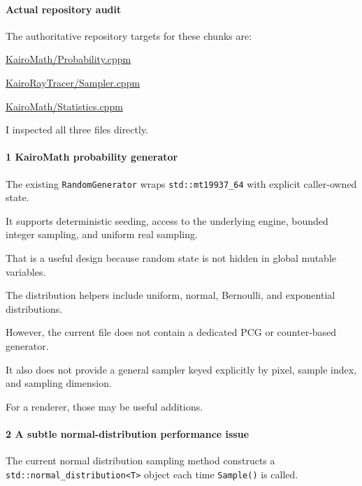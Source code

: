 \paragraph{Actual repository audit}\label{02-foundations-ii-ch039-actual-repository-audit}

The authoritative repository targets for these chunks are:

\href{https://github.com/swayam8624/KairoMath/blob/master/Probability.cppm?utm_source=chatgpt.com}{KairoMath/Probability.cppm}

\href{https://github.com/swayam8624/KairoRayTracer/blob/main/Sampler.cppm?utm_source=chatgpt.com}{KairoRayTracer/Sampler.cppm}

\href{https://github.com/swayam8624/KairoMath/blob/master/Statistics.cppm?utm_source=chatgpt.com}{KairoMath/Statistics.cppm}

I inspected all three files directly.

\paragraph{1 KairoMath probability generator}\label{02-foundations-ii-ch039-kairomath-probability-generator}

The existing \texttt{RandomGenerator} wraps \texttt{std::mt19937\_64} with explicit caller-owned state.

It supports deterministic seeding, access to the underlying engine, bounded integer sampling, and uniform real sampling.

That is a useful design because random state is not hidden in global mutable variables.

The distribution helpers include uniform, normal, Bernoulli, and exponential distributions.

However, the current file does not contain a dedicated PCG or counter-based generator.

It also does not provide a general sampler keyed explicitly by pixel, sample index, and sampling dimension.

For a renderer, those may be useful additions.

\paragraph{2 A subtle normal-distribution performance issue}\label{02-foundations-ii-ch039-a-subtle-normal-distribution-performance-issue}

The current normal distribution sampling method constructs a \texttt{std::normal\_distribution\textless{}T\textgreater{}} object each time \texttt{Sample()} is called.

